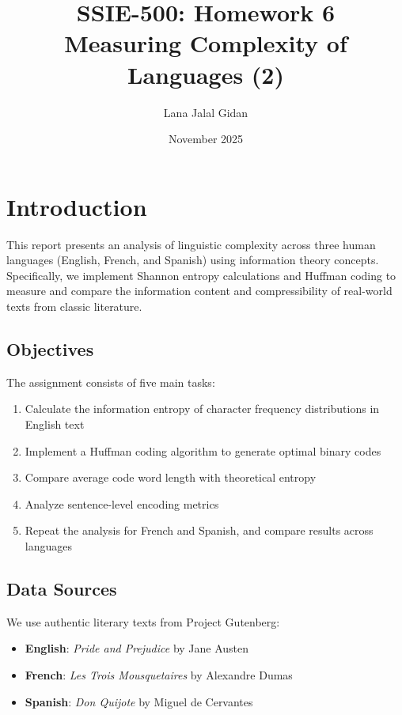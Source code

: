 \documentclass[11pt,a4paper]{article}
\title{\textbf{SSIE-500: Homework 6} \\
\Large Measuring Complexity of Languages (2)}
\author{Lana Jalal Gidan}
\date{November 2025}
\begin{document}
\maketitle

\section{Introduction}

This report presents an analysis of linguistic complexity across three human languages (English, French, and Spanish) using information theory concepts. Specifically, we implement Shannon entropy calculations and Huffman coding to measure and compare the information content and compressibility of real-world texts from classic literature.

\subsection{Objectives}

The assignment consists of five main tasks:

\begin{enumerate}
    \item Calculate the information entropy of character frequency distributions in English text
    \item Implement a Huffman coding algorithm to generate optimal binary codes
    \item Compare average code word length with theoretical entropy
    \item Analyze sentence-level encoding metrics
    \item Repeat the analysis for French and Spanish, and compare results across languages
\end{enumerate}

\subsection{Data Sources}

We use authentic literary texts from Project Gutenberg:

\begin{itemize}
    \item \textbf{English}: \textit{Pride and Prejudice} by Jane Austen
    \item \textbf{French}: \textit{Les Trois Mousquetaires} by Alexandre Dumas
    \item \textbf{Spanish}: \textit{Don Quijote} by Miguel de Cervantes
\end{itemize}
\end{document}
